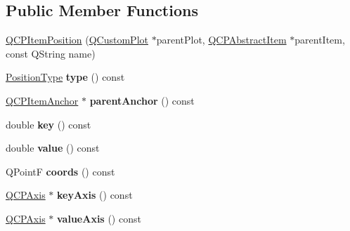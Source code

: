 \subsection*{Public Member Functions}
\begin{DoxyCompactItemize}
\item 
\hyperlink{classQCPItemPosition_a3efc524f37fdcd22907545eb77555ce4}{Q\-C\-P\-Item\-Position} (\hyperlink{classQCustomPlot}{Q\-Custom\-Plot} $\ast$parent\-Plot, \hyperlink{classQCPAbstractItem}{Q\-C\-P\-Abstract\-Item} $\ast$parent\-Item, const Q\-String name)
\item 
\hypertarget{classQCPItemPosition_ad64a1a26fbed5b8917e0eb8843099fd6}{\hyperlink{classQCPItemPosition_aad9936c22bf43e3d358552f6e86dbdc8}{Position\-Type} {\bfseries type} () const }\label{classQCPItemPosition_ad64a1a26fbed5b8917e0eb8843099fd6}

\item 
\hypertarget{classQCPItemPosition_a0db87cc41efabc1cf94acee7ebe14eee}{\hyperlink{classQCPItemAnchor}{Q\-C\-P\-Item\-Anchor} $\ast$ {\bfseries parent\-Anchor} () const }\label{classQCPItemPosition_a0db87cc41efabc1cf94acee7ebe14eee}

\item 
\hypertarget{classQCPItemPosition_ac3cb2bddf5f89e5181830be30b93d090}{double {\bfseries key} () const }\label{classQCPItemPosition_ac3cb2bddf5f89e5181830be30b93d090}

\item 
\hypertarget{classQCPItemPosition_a6817f7356d3a2b63e8446c6b6106dae1}{double {\bfseries value} () const }\label{classQCPItemPosition_a6817f7356d3a2b63e8446c6b6106dae1}

\item 
\hypertarget{classQCPItemPosition_a253d7adbb6d46299bd6cbc31aa8819f1}{Q\-Point\-F {\bfseries coords} () const }\label{classQCPItemPosition_a253d7adbb6d46299bd6cbc31aa8819f1}

\item 
\hypertarget{classQCPItemPosition_ab99de7ae5766d246defb2de9f47eaf51}{\hyperlink{classQCPAxis}{Q\-C\-P\-Axis} $\ast$ {\bfseries key\-Axis} () const }\label{classQCPItemPosition_ab99de7ae5766d246defb2de9f47eaf51}

\item 
\hypertarget{classQCPItemPosition_a8d3a039fb2e69df86b4015daa30dfd2d}{\hyperlink{classQCPAxis}{Q\-C\-P\-Axis} $\ast$ {\bfseries value\-Axis} () const }\label{classQCPItemPosition_a8d3a039fb2e69df86b4015daa30dfd2d}


\end{DoxyCompactItemize}
